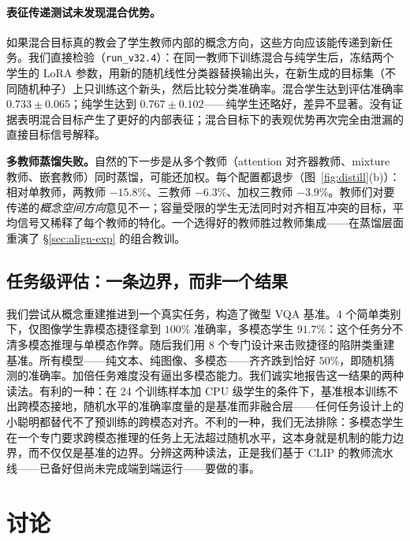 \documentclass[10pt,twoside]{article}
\begin{document}
\paragraph{表征传递测试未发现混合优势。}
如果混合目标真的教会了学生教师内部的概念方向，这些方向应该能传递到新任务。我们直接检验（\texttt{run\_v32.4}）：在同一教师下训练混合与纯学生后，冻结两个学生的 LoRA 参数，用新的随机线性分类器替换输出头，在新生成的目标集（不同随机种子）上只训练这个新头，然后比较分类准确率。混合学生达到评估准确率 $0.733 \pm 0.065$；纯学生达到 $0.767 \pm 0.102$——纯学生还略好，差异不显著。没有证据表明混合目标产生了更好的内部表征；混合目标下的表观优势再次完全由泄漏的直接目标信号解释。

\textbf{多教师蒸馏失败。}自然的下一步是从多个教师（attention 对齐器教师、mixture 教师、嵌套教师）同时蒸馏，可能还加权。每个配置都退步（图~\ref{fig:distill}(b)）：相对单教师，两教师 $-15.8\%$、三教师 $-6.3\%$、加权三教师 $-3.9\%$。教师们对要传递的\emph{概念空间方向}意见不一；容量受限的学生无法同时对齐相互冲突的目标，平均信号又稀释了每个教师的特化。一个选得好的教师胜过教师集成——在蒸馏层面重演了 \S\ref{sec:align-exp} 的组合教训。

\subsection{任务级评估：一条边界，而非一个结果}
\label{sec:vqa-exp}

我们尝试从概念重建推进到一个真实任务，构造了微型 VQA 基准。4 个简单类别下，仅图像学生靠模态捷径拿到 $100\%$ 准确率，多模态学生 $91.7\%$：这个任务分不清多模态推理与单模态作弊。随后我们用 8 个专门设计来击败捷径的陷阱类重建基准。所有模型——纯文本、纯图像、多模态——齐齐跌到恰好 $50\%$，即随机猜测的准确率。加倍任务难度没有逼出多模态能力。我们诚实地报告这一结果的两种读法。有利的一种：在 24 个训练样本加 CPU 级学生的条件下，基准根本训练不出跨模态接地，随机水平的准确率度量的是基准而非融合层——任何任务设计上的小聪明都替代不了预训练的跨模态对齐。不利的一种，我们无法排除：多模态学生在一个专门要求跨模态推理的任务上无法超过随机水平，这本身就是机制的能力边界，而不仅仅是基准的边界。分辨这两种读法，正是我们基于 CLIP \citep{radford2021} 的教师流水线——已备好但尚未完成端到端运行——要做的事。

\section{讨论}
\label{sec:discussion}
\end{document}
